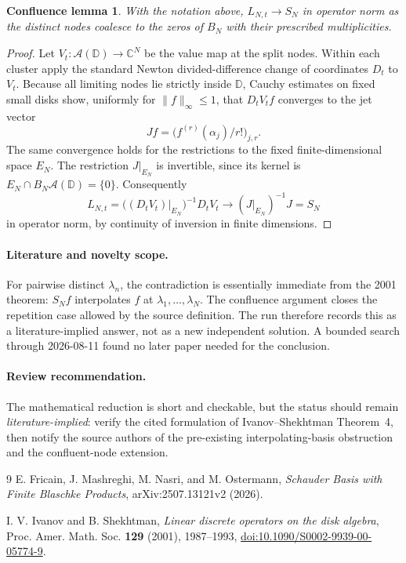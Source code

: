 \documentclass[10pt]{article}
\newtheorem*{lemma}{Confluence lemma}
\newcommand{\A}{\mathcal A(\mathbb D)}
\newcommand{\D}{\mathbb D}
\begin{document}
\begin{lemma}
With the notation above, $L_{N,t}\to S_N$ in operator norm as the distinct
nodes coalesce to the zeros of $B_N$ with their prescribed multiplicities.
\end{lemma}

\begin{proof}
Let $V_t:\A\to\mathbb C^N$ be the value map at the split nodes.  Within each
cluster apply the standard Newton divided-difference change of coordinates
$D_t$ to $V_t$.  Because all limiting nodes lie strictly inside $\D$, Cauchy
estimates on fixed small disks show, uniformly for $\|f\|_\infty\le1$, that
$D_tV_tf$ converges to the jet vector
\[
 Jf=\bigl(f^{(r)}(\alpha_j)/r!\bigr)_{j,r}.
\]
The same convergence holds for the restrictions to the fixed
finite-dimensional space $E_N$.  The restriction $J|_{E_N}$ is invertible,
since its kernel is $E_N\cap B_N\A=\{0\}$.  Consequently
\[
 L_{N,t}
 =\bigl((D_tV_t)|_{E_N}\bigr)^{-1}D_tV_t
 \longrightarrow (J|_{E_N})^{-1}J=S_N
\]
in operator norm, by continuity of inversion in finite dimensions.
\end{proof}

\paragraph{Literature and novelty scope.}
For pairwise distinct $\lambda_n$, the contradiction is essentially immediate
from the 2001 theorem: $S_Nf$ interpolates $f$ at
$\lambda_1,\ldots,\lambda_N$.  The confluence argument closes the repetition
case allowed by the source definition.  The run therefore records this as a
literature-implied answer, not as a new independent solution.  A bounded
search through 2026-08-11 found no later paper needed for the conclusion.

\paragraph{Review recommendation.}
The mathematical reduction is short and checkable, but the status should
remain \emph{literature-implied}: verify the cited formulation of
Ivanov--Shekhtman Theorem~4, then notify the source authors of the pre-existing
interpolating-basis obstruction and the confluent-node extension.

\begin{thebibliography}{9}
E. Fricain, J. Mashreghi, M. Nasri, and M. Ostermann,
\emph{Schauder Basis with Finite Blaschke Products},
arXiv:2507.13121v2 (2026).

I. V. Ivanov and B. Shekhtman,
\emph{Linear discrete operators on the disk algebra},
Proc. Amer. Math. Soc. \textbf{129} (2001), 1987--1993,
\href{https://doi.org/10.1090/S0002-9939-00-05774-9}{doi:10.1090/S0002-9939-00-05774-9}.
\end{thebibliography}
\end{document}
